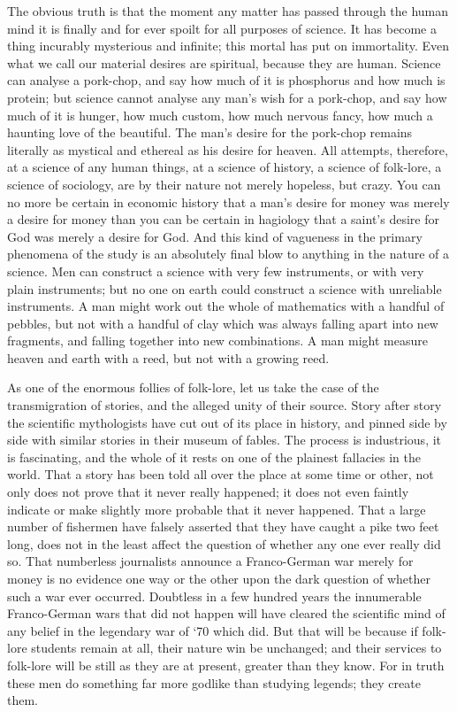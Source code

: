 The obvious truth is that the moment any matter has passed through the human mind it is finally and for ever spoilt for all purposes of science. It has become a thing incurably mysterious and infinite; this mortal has put on immortality. Even what we call our material desires are spiritual, because they are human. Science can analyse a pork-chop, and say how much of it is phosphorus and how much is protein; but science cannot analyse any man’s wish for a pork-chop, and say how much of it is hunger, how much custom, how much nervous fancy, how much a haunting love of the beautiful. The man’s desire for the pork-chop remains literally as mystical and ethereal as his desire for heaven. All attempts, therefore, at a science of any human things, at a science of history, a science of folk-lore, a science of sociology, are by their nature not merely hopeless, but crazy. You can no more be certain in economic history that a man’s desire for money was merely a desire for money than you can be certain in hagiology that a saint’s desire for God was merely a desire for God. And this kind of vagueness in the primary phenomena of the study is an absolutely final blow to anything in the nature of a science. Men can construct a science with very few instruments, or with very plain instruments; but no one on earth could construct a science with unreliable instruments. A man might work out the whole of mathematics with a handful of pebbles, but not with a handful of clay which was always falling apart into new fragments, and falling together into new combinations. A man might measure heaven and earth with a reed, but not with a growing reed.

As one of the enormous follies of folk-lore, let us take the case of the transmigration of stories, and the alleged unity of their source. Story after story the scientific mythologists have cut out of its place in history, and pinned side by side with similar stories in their museum of fables. The process is industrious, it is fascinating, and the whole of it rests on one of the plainest fallacies in the world. That a story has been told all over the place at some time or other, not only does not prove that it never really happened; it does not even faintly indicate or make slightly more probable that it never happened. That a large number of fishermen have falsely asserted that they have caught a pike two feet long, does not in the least affect the question of whether any one ever really did so. That numberless journalists announce a Franco-German war merely for money is no evidence one way or the other upon the dark question of whether such a war ever occurred. Doubtless in a few hundred years the innumerable Franco-German wars that did not happen will have cleared the scientific mind of any belief in the legendary war of ‘70 which did. But that will be because if folk-lore students remain at all, their nature win be unchanged; and their services to folk-lore will be still as they are at present, greater than they know. For in truth these men do something far more godlike than studying legends; they create them.

